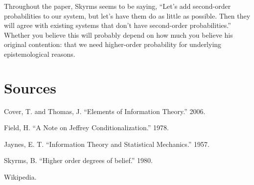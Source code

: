 \documentclass[letterpaper,12pt]{article}
\begin{document}
Throughout the paper, Skyrms seems to be saying, ``Let's add second-order probabilities to our system, but let's have them do as little as possible. Then they will agree with existing systems that don't have second-order probabilities.'' Whether you believe this will probably depend on how much you believe his original contention: that we need higher-order probability for underlying epistemological reasons.

\section{Sources}

Cover, T. and Thomas, J. ``Elements of Information Theory.'' 2006.

Field, H. ``A Note on Jeffrey Conditionalization.'' 1978.

Jaynes, E. T. ``Information Theory and Statistical Mechanics.'' 1957.

Skyrms, B. ``Higher order degrees of belief.'' 1980.

Wikipedia.
\end{document}
